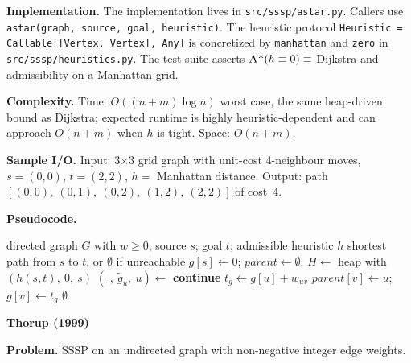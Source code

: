 \documentclass[12pt]{article}
\begin{document}
{\raggedright\setlength{\parindent}{0.5in}
\indent\textbf{Implementation.} The implementation lives in \texttt{src/sssp/astar.py}. Callers use \texttt{astar(graph, source, goal, heuristic)}. The heuristic protocol \texttt{Heuristic = Callable[[Vertex, Vertex], Any]} is concretized by \texttt{manhattan} and \texttt{zero} in \texttt{src/sssp/heuristics.py}. The test suite asserts $\textsc{A*}(h \equiv 0) \equiv$ Dijkstra and admissibility on a Manhattan grid.
\par}
\medskip

\textbf{Complexity.} Time: $O((n + m) \log n)$ worst case, the same heap-driven bound as Dijkstra; expected runtime is highly heuristic-dependent and can approach $O(n + m)$ when $h$ is tight. Space: $O(n + m)$.
\medskip

\textbf{Sample I/O.} Input: 3$\times$3 grid graph with unit-cost 4-neighbour moves, $s = (0,0)$, $t = (2,2)$, $h = $ Manhattan distance. Output: path $[(0,0),\ (0,1),\ (0,2),\ (1,2),\ (2,2)]$ of cost~4.

\newpage
\noindent\textbf{Pseudocode.}

\begin{algorithm}[H]
\caption{A* (heap-backed frontier)}
\begin{algorithmic}[1]
\Require directed graph $G$ with $w \ge 0$; source $s$; goal $t$; admissible heuristic $h$
\Ensure shortest path from $s$ to $t$, or $\emptyset$ if unreachable
\State $g[s] \gets 0$; $\mathit{parent} \gets \emptyset$; $H \gets$ heap with $(h(s, t),\ 0,\ s)$ 
  \State $(\_,\ \tilde{g}_u,\ u) \gets$ 
   \State \textbf{continue} 
  \EndIf
   \State \Return {} \EndIf
    \State $t_{g} \gets g[u] + w_{uv}$
      \State $\mathit{parent}[v] \gets u$; $g[v] \gets t_{g}$
      \State {}
    \EndIf
  \EndFor
\EndWhile
\State \Return $\emptyset$
\end{algorithmic}
\end{algorithm}

\newpage
\noindent\textbf{Thorup (1999)}\label{sec:algo-thorup}
\medskip

\textbf{Problem.} SSSP on an undirected graph with non-negative integer edge weights.
\medskip
\end{document}
